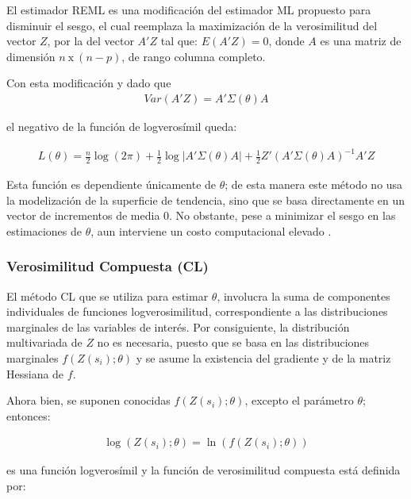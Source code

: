 \documentclass[
]{book}
\begin{document}
El estimador REML es una modificación del estimador ML propuesto para disminuir el sesgo, el cual reemplaza la maximización de la verosimilitud del vector \(Z\), por la del vector \(A'Z\) tal que: \(E(A'Z)=0\), donde \(A\) es una matriz de dimensión \(n\ \text{x}\ (n-p)\), de rango columna completo.

Con esta modificación y dado que \begin{align*}
  Var(A'Z)=A'\Sigma(\theta)A  
\end{align*}

el negativo de la función de logverosímil queda:

\begin{align*}
   L(\theta)=\frac{n}{2}\log(2\pi)+\frac{1}{2} \log|A'\Sigma(\theta) A|+\frac{1}{2}Z'(A'\Sigma(\theta) A)^{-1} A'Z 
\end{align*}

Esta función es dependiente únicamente de \(\theta\); de esta manera este método no usa la modelización de la superficie de tendencia, sino que se basa directamente en un vector de incrementos de media 0. No obstante, pese a minimizar el sesgo en las estimaciones de \(\theta\), aun interviene un costo computacional elevado \citep{marta}.

\hypertarget{verosimilitud-compuesta-cl}{%
\subsubsection*{Verosimilitud Compuesta (CL)}\label{verosimilitud-compuesta-cl}}

El método CL que se utiliza para estimar \(\theta\), involucra la suma de componentes individuales de funciones logverosimilitud, correspondiente a las distribuciones marginales de las variables de interés. Por consiguiente, la distribución multivariada de \(Z\) no es necesaria, puesto que se basa en las distribuciones marginales \(f(Z(s_i);\theta)\) y se asume la existencia del gradiente y de la matriz Hessiana de \(f\).

Ahora bien, se suponen conocidas \(f(Z(s_i);\theta)\), excepto el parámetro \(\theta\); entonces:

\begin{align*}
  \log(Z(s_i);\theta)=\ln(f(Z(s_i);\theta))  
\end{align*}

es una función logverosímil y la función de verosimilitud compuesta está definida por:
\end{document}
